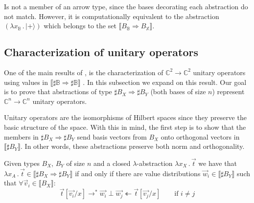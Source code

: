 \documentclass[runningheads,orivec,envcountsame,envcountsect]{llncs}
\newcommand\ket[1]{\ensuremath{|#1\rangle}}
\newcommand\lra{\longrightarrow}
\def\C{\mathbb{C}}            %
\def\Lam#1#2#3{\lambda#1_{#2}\,{.}\,#3} %
\def\eval{\lra^*}
\def\Arr{\Rightarrow}
\def\sem#1{\llbracket#1\rrbracket}
\newcommand\B{\mathbb B}
\newcommand\XB{\mathbb X}
\newcommand\basis[1]{\ensuremath{B_{ #1 }}}
\begin{document}
Is not a member of an arrow type, since the bases decorating each abstraction do not match. However, it is computationally equivalent to the abstraction $(\Lam{x}{\B}{\ket{+}})$ which belongs to the set $\sem{\basis{\B}\Arr\basis{\XB}}$.

\subsection{Characterization of unitary operators}


One of the main results of \cite{DiazcaroGuillermoMiquelValironLICS19}, is the characterization of $\C^2\to\C^2$ unitary operators using values in $\sem{\sharp\B\Arr\sharp\B}$ \cite[Theorem IV.12]{DiazcaroGuillermoMiquelValironLICS19}. In this subsection we expand on this result. Our goal is to prove that abstractions of type $\sharp\basis{X}\Arr\sharp\basis{Y}$ (both bases of size $n$) represent $\C^n\to\C^n$ unitary operators.

Unitary operators are the isomorphisms of Hilbert spaces since they preserve the basic structure of the space. With this in mind, the first step is to show that the members in $\sharp\basis{X}\Arr\sharp{\basis{Y}}$ send basis vectors from $\basis{X}$ onto orthogonal vectors in $\sem{\sharp\basis{Y}}$. In other words, these abstractions preserve both norm and orthogonality.

\begin{lemma}\label{lem:BasesIso}
  Given types $\basis{X}$, $\basis{Y}$ of size $n$ and a closed $\lambda$-abstraction $\Lam{x}{X}{\vec t}$ we have that $\Lam{x}{A}{\vec t}\in\sem{\sharp\basis{X}\Arr\sharp\basis{Y}}$ if and only if there are value distributions $\vec w_i\in\sem{\sharp\basis{Y}}$ such that $\forall\vec v_i\in\sem{\basis{X}}$:
  \[
    \vec{t}[\vec{v_i}/x]\eval\vec{w_i}\perp\vec{w_j}\twoheadleftarrow \vec{t}[\vec{v_j}/x] \qquad \text{if } i\neq j
  \]
\end{lemma}
\end{document}
